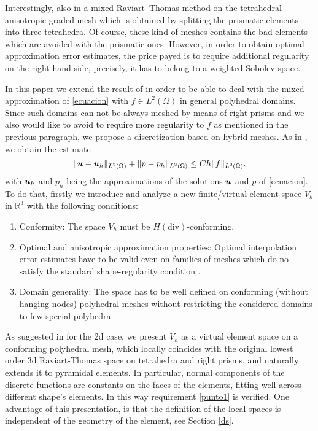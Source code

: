 Interestingly, also in \cite{FNP} a mixed Raviart--Thomas method on the tetrahedral anisotropic graded mesh which is obtained by splitting the prismatic elements into three tetrahedra. Of course, these kind of meshes contains the bad elements which are avoided with the prismatic ones. However, in order to obtain optimal approximation error estimates, the price payed is to require additional regularity on the right hand side, precisely, it has to belong to a weighted Sobolev space.


In this paper we extend the result of \cite{FNP} in order to be able to deal with the mixed approximation of \eqref{ecuacion} with $f\in L^2(\Omega)$ in general polyhedral domains. Since such domains can not be always meshed by means of right prisms and we also would like to avoid to require more regularity to $f$ as mentioned in the previous paragraph, we propose a discretization based on hybrid meshes. As in \cite{FNP}, we obtain the estimate
\begin{equation}\label{jl2: aim}
\|\boldsymbol{u}-\boldsymbol{u}_h\|_{L^2(\Omega)} + \|p-p_h\|_{L^2(\Omega)} \le Ch\|f\|_{L^2(\Omega)}.
\end{equation}
with $\boldsymbol{u}_h$ and $p_h$ being the approximations of the solutions $\boldsymbol{u}$ and $p$ of \eqref{ecuacion}. To do that, firstly we introduce and analyze a new finite/virtual element space $V_h$ in $\mathbb R^3$ with the following conditions:  
\begin{enumerate}
\item \label{punto1} Conformity: The space $V_h$ must be $H(\mbox{div})$-conforming.
\item \label{punto2} Optimal and anisotropic approximation properties: Optimal interpolation error estimates have to be valid even on families of meshes which do no satisfy the standard shape-regularity condition \cite{C}.
\item \label{punto3} Domain generality: The space has to be well defined on conforming (without hanging nodes) polyhedral meshes without restricting the considered domains to few special polyhedra. 
\end{enumerate}

As suggested in \cite{BFM} for the 2d case, we present $V_h$ as a virtual element space on a conforming polyhedral mesh, which locally coincides with the original lowest order 3d Raviart-Thomas space on tetrahedra and right prisms, and naturally extends it to pyramidal elements. In particular, normal components of the discrete functions are constants on the faces of the elements, fitting well across different shape's elements. In this way requirement \ref{punto1} is verified. One advantage of this presentation, is that the definition of the local spaces is independent of the geometry of the element, see Section \ref{ds}. 

